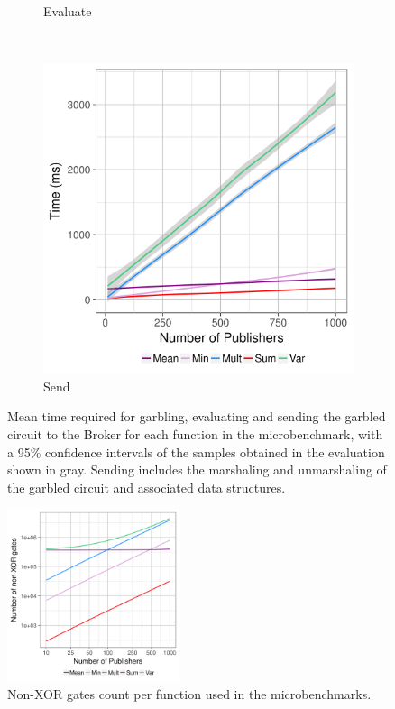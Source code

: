 \begin{figure}
\begin{subfigure}[b]{0.32\textwidth}
        \caption{Evaluate}
        \label{fig:micro-eval-time}
    \end{subfigure}
    ~ %
    \begin{subfigure}[b]{0.32\textwidth}
        \includegraphics[width=\textwidth]{plots/send.png}
        \caption{Send}
        \label{fig:micro-send-time}
    \end{subfigure}
    \caption{Mean time required for garbling, evaluating and sending the
    garbled circuit to the Broker for each function in the microbenchmark, with
    a 95\% confidence intervals of the samples obtained in the evaluation shown
    in gray.  Sending includes the marshaling and unmarshaling of the garbled
    circuit and associated data structures.}\label{fig:micro-times}
\end{figure}


\begin{figure}
  \includegraphics[width=0.45\textwidth]{plots/nonxor_gates_log.png}
  \caption{Non-XOR gates count per function used in the microbenchmarks.}
  \label{micro-nonxor}
\end{figure}

